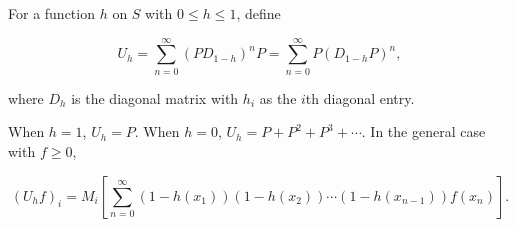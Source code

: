 For a function $h$ on $S$ with $0 \leq h \leq 1$, define

$$U_h = \sum_{n=0}^{\infty} (P D_{1-h})^n P = \sum_{n=0}^{\infty} P (D_{1-h} P)^n,$$

where $D_h$ is the diagonal matrix with $h_i$ as the $i$th diagonal entry.

When $h = 1$, $U_h = P$. When $h = 0$, $U_h = P + P^2 + P^3 + \cdots$. In the general case with $f \geq 0$,

$$\left(U_h f\right)_i = M_i \left[ \sum_{n=0}^{\infty} \left(1 - h(x_1)\right)\left(1 - h(x_2)\right) \cdots \left(1 - h(x_{n-1})\right) f(x_n) \right].$$
